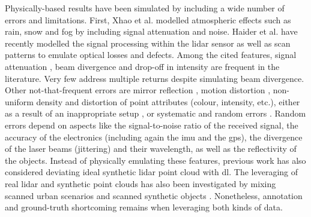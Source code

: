 Physically-based results have been simulated by including a wide number of errors and limitations. First, Xhao et al. \cite{zhao_method_2021} modelled atmospheric effects such as rain, snow and fog by including signal attenuation and noise. Haider et al. \cite{haider_development_2022} have recently modelled the signal processing within the \acrshort{lidar} sensor as well as scan patterns to emulate optical losses and defects. Among the cited features, signal attenuation \cite{dosovitskiy_carla_2017, bechtold_helios_2016, hanke_generation_2017}, beam divergence \cite{zhao_method_2021, bechtold_helios_2016, hanke_generation_2017, haider_development_2022} and drop-off in intensity \cite{ahn_real-time_2020} are frequent in the literature. Very few address multiple returns \cite{winiwarter_virtual_2022} despite simulating beam divergence. Other not-that-frequent errors are mirror reflection \cite{ullrich_advances_2019}, motion distortion \cite{chen_analysis_2022}, non-uniform density and distortion of point attributes (colour, intensity, etc.), either as a result of an inappropriate setup \cite{dimitrov_segmentation_2015}, or systematic and random errors \cite{isheil_systematic_2011, fan_error_2015, pandzic_error_2017}. Random errors depend on aspects like the signal-to-noise ratio of the received signal, the accuracy of the electronics (including again the \acrshort{imu} and the \acrshort{gps}), the divergence of the laser beams (jittering) and their wavelength, as well as the reflectivity of the objects. Instead of physically emulating these features, previous work has also considered deviating ideal synthetic \acrshort{lidar} point cloud with \acrshort{dl}\cite{manivasagam_lidarsim_2020, xiao_synlidar_2021, guillard_learning_2022}. The leveraging of real \acrshort{lidar} and synthetic point clouds has also been investigated by mixing scanned urban scenarios and scanned synthetic objects \cite{manivasagam_lidarsim_2020}. Nonetheless, annotation and ground-truth shortcoming remains when leveraging both kinds of data.

